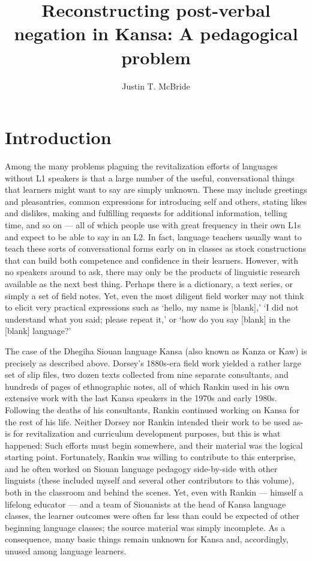 \documentclass[output=paper]{LSP/langsci}
\author{Justin T. McBride}
\title{Reconstructing post-verbal negation in Kansa: A pedagogical problem}
\begin{document}
\section{Introduction}
Among the many problems plaguing the revitalization efforts of languages without L1 speakers is that a large number of the useful, conversational things that learners might want to say are simply unknown. These may include greetings and pleasantries, common expressions for introducing self and others, stating likes and dislikes, making and fulfilling requests for additional information, telling time, and so on --- all of which people use with great frequency in their own L1s and expect to be able to say in an L2. In fact, language teachers usually want to teach these sorts of conversational forms early on in classes as stock constructions that can build both competence and confidence in their learners. However, with no speakers around to ask, there may only be the products of linguistic research available as the next best thing. Perhaps there is a dictionary, a text series, or simply a set of field notes. Yet, even the most diligent field worker may not think to elicit very practical expressions such as `hello, my name is [blank],' `I did not understand what you said; please repeat it,' or `how do you say [blank] in the [blank] language?' 

The case of the Dhegiha Siouan language Kansa (also known as Kanza or Kaw) is precisely as described above. Dorsey's 1880s-era field work yielded a rather large set of slip files, two dozen texts collected from nine separate consultants, and hundreds of pages of ethnographic notes, all of which Rankin used in his own extensive work with the last Kansa speakers in the 1970s and early 1980s. Following the deaths of his consultants, Rankin continued working on Kansa for the rest of his life. Neither Dorsey nor Rankin intended their work to be used as-is for revitalization and curriculum development purposes, but this is what happened: Such efforts must begin somewhere, and their material was the logical starting point. Fortunately, Rankin was willing to contribute to this enterprise, and he often worked on Siouan language pedagogy side-by-side with other linguists (these included myself and several other contributors to this volume), both in the classroom and behind the scenes. Yet, even with Rankin --- himself a lifelong educator --- and a team of Siouanists at the head of Kansa language classes, the learner outcomes were often far less than could be expected of other beginning language classes; the source material was simply incomplete. As a consequence, many basic things remain unknown for Kansa and, accordingly, unused among language learners.
 
\end{document}
